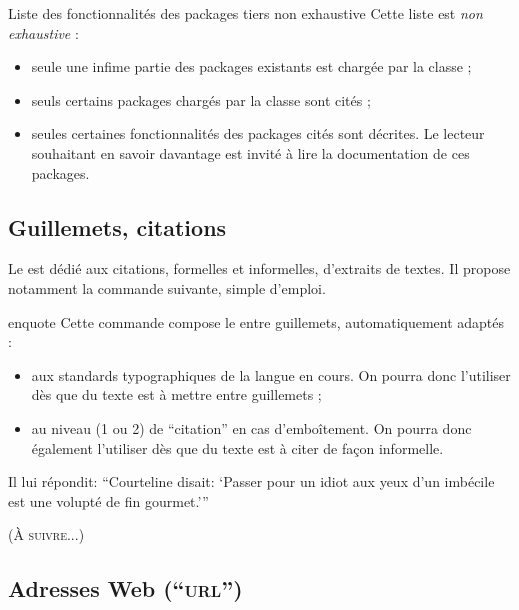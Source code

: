 \begin{dbwarning}{Liste des fonctionnalités des packages tiers non exhaustive}{}
  Cette liste est \emph{non exhaustive} :
  \begin{itemize}
  \item seule une infime partie des packages existants est chargée par la
    classe ;
  \item seuls certains packages chargés par la classe sont cités ;
  \item seules certaines fonctionnalités des packages cités sont décrites. Le
    lecteur souhaitant en savoir davantage est invité à lire la documentation de
    ces packages.
  \end{itemize}
\end{dbwarning}

\subsection{Guillemets, citations}
\label{sec:guillemets-citations}

Le  est dédié aux citations, formelles et informelles,
d'extraits de textes. Il propose notamment la commande 
suivante, simple d'emploi.

\begin{docCommand}{enquote}{}
  Cette commande compose le  entre guillemets, automatiquement
  adaptés :
  \begin{itemize}
  \item aux standards typographiques de la langue en cours. On pourra donc
    l'utiliser dès que du texte est à mettre entre guillemets ;
  \item au niveau (1 ou 2) de \enquote{citation} en cas d'emboîtement. On
    pourra donc également l'utiliser dès que du texte est à citer de façon
    informelle.
  \end{itemize}
\begin{bodycode}
Il lui répondit: \enquote{Courteline disait: \enquote{Passer pour un idiot aux
    yeux d'un imbécile est une volupté de fin gourmet.}}
\end{bodycode}
\end{docCommand}

(\textsc{À suivre...})

\subsection{Adresses Web (\enquote{\textsc{url}})}
\label{sec:url}

